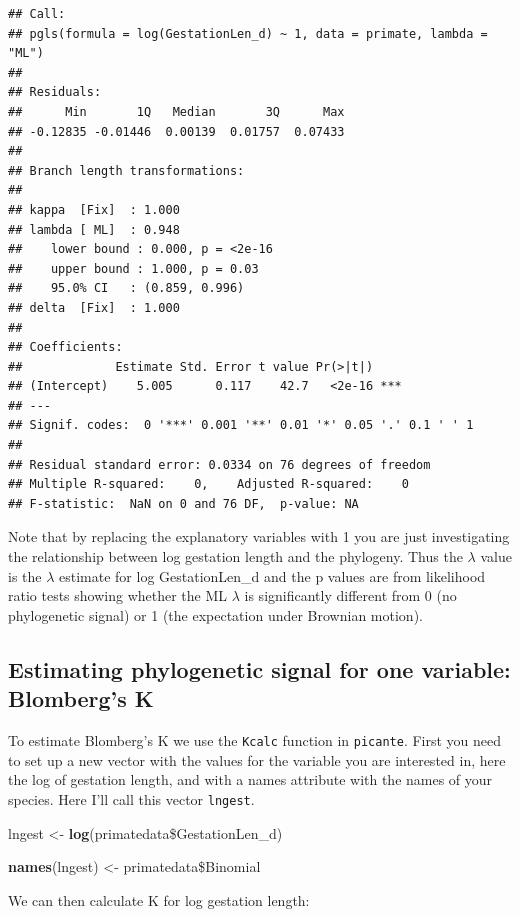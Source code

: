 \documentclass[12pt]{article}
\newcommand{\KeywordTok}[1]{\textcolor[rgb]{0.13,0.29,0.53}{\textbf{{#1}}}}
\newcommand{\StringTok}[1]{\textcolor[rgb]{0.31,0.60,0.02}{{#1}}}
\newcommand{\NormalTok}[1]{{#1}}
\begin{document}
\newpage
\begin{verbatim}
## Call:
## pgls(formula = log(GestationLen_d) ~ 1, data = primate, lambda = "ML")
## 
## Residuals:
##      Min       1Q   Median       3Q      Max 
## -0.12835 -0.01446  0.00139  0.01757  0.07433 
## 
## Branch length transformations:
## 
## kappa  [Fix]  : 1.000
## lambda [ ML]  : 0.948
##    lower bound : 0.000, p = <2e-16
##    upper bound : 1.000, p = 0.03 
##    95.0% CI   : (0.859, 0.996)
## delta  [Fix]  : 1.000
## 
## Coefficients:
##             Estimate Std. Error t value Pr(>|t|)    
## (Intercept)    5.005      0.117    42.7   <2e-16 ***
## ---
## Signif. codes:  0 '***' 0.001 '**' 0.01 '*' 0.05 '.' 0.1 ' ' 1
## 
## Residual standard error: 0.0334 on 76 degrees of freedom
## Multiple R-squared:    0,    Adjusted R-squared:    0 
## F-statistic:  NaN on 0 and 76 DF,  p-value: NA
\end{verbatim}

Note that by replacing the explanatory variables with 1 you are just investigating the relationship between log gestation length and the phylogeny. Thus the $\lambda$ value is the $\lambda$ estimate for log GestationLen\_d and the p values are from likelihood ratio tests showing whether the ML $\lambda$ is significantly different from 0 (no phylogenetic signal) or 1 (the expectation under Brownian motion).

\subsection{Estimating phylogenetic signal for one variable: Blomberg's K}

To estimate Blomberg’s K we use the \texttt{Kcalc} function in \texttt{picante}. First you need to set up a new vector with the values for the variable you are interested in, here the log of gestation length, and with a names attribute with the names of your species. Here I'll call this vector \texttt{lngest}.

\begin{snugshade}
\begin{Highlighting}[]
\NormalTok{lngest <-}\StringTok{ }\KeywordTok{log}\NormalTok{(primatedata\$GestationLen_d)}

\KeywordTok{names}\NormalTok{(lngest) <-}\StringTok{ }\NormalTok{primatedata\$Binomial}
\end{Highlighting}
\end{snugshade}

We can then calculate K for log gestation length:
\end{document}
